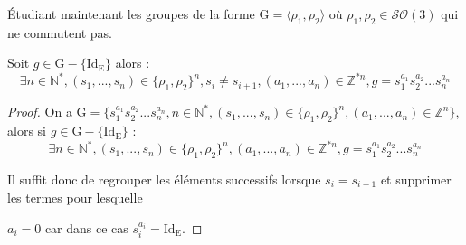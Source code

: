 \noindent
Étudiant maintenant les groupes de la forme $\mathrm{G} = \langle\rho_1, \rho_2 \rangle$ où $\rho_1, \rho_2 \in \mathcal{SO}(3)$ qui ne commutent pas.\par
\begin{prop}\label{prop2}
  Soit $g \in \mathrm{G}-\{\mathrm{Id_E}\}$ alors :
  $$\exists n \in \mathbb{N}^*,  (s_1, ..., s_n) \in \{\rho_1, \rho_2\}^n,s_i \neq s_{i+1}, (a_1, ..., a_n) \in \mathbb{Z}^{*n}, g = s_1^{a_1}s_2^{a_2}...s_n^{a_n}$$
\end{prop}
\begin{proof}
  \hfill
\par
  On a $\mathrm{G}=\{s_1^{a_1}s_2^{a_2}...s_n^{a_n}, n\in \mathbb{N}^*, (s_1, ..., s_n) \in \{\rho_1, \rho_2\}^n, (a_1, ..., a_n) \in \mathbb{Z}^n\}$, alors si $g \in \mathrm{G}-\{\mathrm{Id_E}\}$ : $$\exists n \in \mathbb{N}^*,  (s_1, ..., s_n) \in \{\rho_1, \rho_2\}^n, (a_1, ..., a_n) \in \mathbb{Z}^{*n}, g = s_1^{a_1}s_2^{a_2}...s_n^{a_n}$$\par Il suffit donc de regrouper les éléments successifs lorsque $s_i=s_{i+1}$ et supprimer les termes pour lesquelle \par $a_i=0$ car dans ce cas $s_i^{a_i}=\mathrm{Id_E}$.

\end{proof}
%
